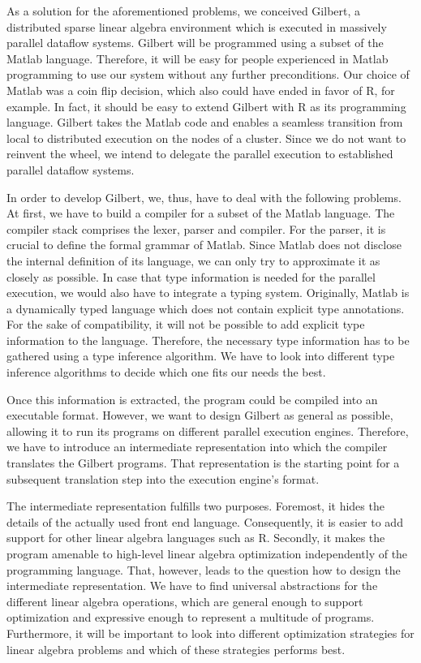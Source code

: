 As a solution for the aforementioned problems, we conceived Gilbert, a distributed sparse linear algebra environment which is executed in massively parallel dataflow systems.
Gilbert will be programmed using a subset of the Matlab language.
Therefore, it will be easy for people experienced in Matlab programming to use our system without any further preconditions.
Our choice of Matlab was a coin flip decision, which also could have ended in favor of R, for example.
In fact, it should be easy to extend Gilbert with R as its programming language.
Gilbert takes the Matlab code and enables a seamless transition from local to distributed execution on the nodes of a cluster.
Since we do not want to reinvent the wheel, we intend to delegate the parallel execution to established parallel dataflow systems.

In order to develop Gilbert, we, thus, have to deal with the following problems.
At first, we have to build a compiler for a subset of the Matlab language.
The compiler stack comprises the lexer, parser and compiler.
For the parser, it is crucial to define the formal grammar of Matlab.
Since Matlab does not disclose the internal definition of its language, we can only try to approximate it as closely as possible.
In case that type information is needed for the parallel execution, we would also have to integrate a typing system.
Originally, Matlab is a dynamically typed language which does not contain explicit type annotations.
For the sake of compatibility, it will not be possible to add explicit type information to the language.
Therefore, the necessary type information has to be gathered using a type inference algorithm.
We have to look into different type inference algorithms to decide which one fits our needs the best.

Once this information is extracted, the program could be compiled into an executable format.
However, we want to design Gilbert as general as possible, allowing it to run its programs on different parallel execution engines.
Therefore, we have to introduce an intermediate representation into which the compiler translates the Gilbert programs.
That representation is the starting point for a subsequent translation step into the execution engine's format.

The intermediate representation fulfills two purposes.
Foremost, it hides the details of the actually used front end language.
Consequently, it is easier to add support for other linear algebra languages such as R.
Secondly, it makes the program amenable to high-level linear algebra optimization independently of the programming language.
That, however, leads to the question how to design the intermediate representation.
We have to find universal abstractions for the different linear algebra operations, which are general enough to support optimization and expressive enough to represent a multitude of programs.
Furthermore, it will be important to look into different optimization strategies for linear algebra problems and which of these strategies performs best.

